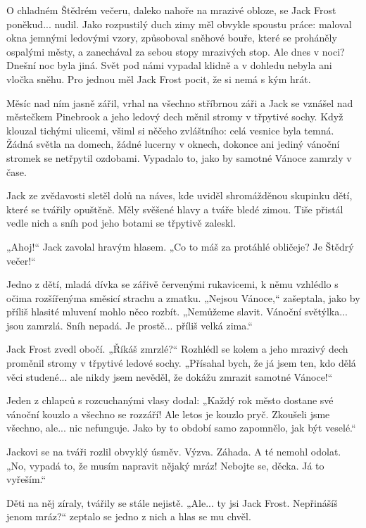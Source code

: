 \documentclass{article}
\begin{document}

O chladném Štědrém večeru, daleko nahoře na mrazivé obloze, se Jack Frost poněkud... nudil. Jako rozpustilý duch zimy měl obvykle spoustu práce: maloval okna jemnými ledovými vzory, způsoboval sněhové bouře, které se proháněly ospalými městy, a zanechával za sebou stopy mrazivých stop. Ale dnes v noci? Dnešní noc byla jiná. Svět pod námi vypadal klidně a v dohledu nebyla ani vločka sněhu. Pro jednou měl Jack Frost pocit, že si nemá s kým hrát.

Měsíc nad ním jasně zářil, vrhal na všechno stříbrnou záři a Jack se vznášel nad městečkem Pinebrook a jeho ledový dech měnil stromy v třpytivé sochy. Když klouzal tichými ulicemi, všiml si něčeho zvláštního: celá vesnice byla temná. Žádná světla na domech, žádné lucerny v oknech, dokonce ani jediný vánoční stromek se netřpytil ozdobami. Vypadalo to, jako by samotné Vánoce zamrzly v čase.

Jack ze zvědavosti sletěl dolů na náves, kde uviděl shromážděnou skupinku dětí, které se tvářily opuštěně. Měly svěšené hlavy a tváře bledé zimou. Tiše přistál vedle nich a sníh pod jeho botami se třpytivě zaleskl.

„Ahoj!“ Jack zavolal hravým hlasem. „Co to máš za protáhlé obličeje? Je Štědrý večer!“

Jedno z dětí, mladá dívka se zářivě červenými rukavicemi, k němu vzhlédlo s očima rozšířenýma směsicí strachu a zmatku. „Nejsou Vánoce,“ zašeptala, jako by příliš hlasité mluvení mohlo něco rozbít. „Nemůžeme slavit. Vánoční světýlka... jsou zamrzlá. Sníh nepadá. Je prostě... příliš velká zima.“

Jack Frost zvedl obočí. „Říkáš zmrzlé?“ Rozhlédl se kolem a jeho mrazivý dech proměnil stromy v třpytivé ledové sochy. „Přísahal bych, že já jsem ten, kdo dělá věci studené... ale nikdy jsem nevěděl, že dokážu zmrazit samotné Vánoce!“

Jeden z chlapců s rozcuchanými vlasy dodal: „Každý rok město dostane své vánoční kouzlo a všechno se rozzáří! Ale letos je kouzlo pryč. Zkoušeli jsme všechno, ale... nic nefunguje. Jako by to období samo zapomnělo, jak být veselé.“

Jackovi se na tváři rozlil obvyklý úsměv. Výzva. Záhada. A té nemohl odolat. „No, vypadá to, že musím napravit nějaký mráz! Nebojte se, děcka. Já to vyřeším.“

Děti na něj zíraly, tvářily se stále nejistě. „Ale... ty jsi Jack Frost. Nepřinášíš jenom mráz?“ zeptalo se jedno z nich a hlas se mu chvěl.
\end{document}
